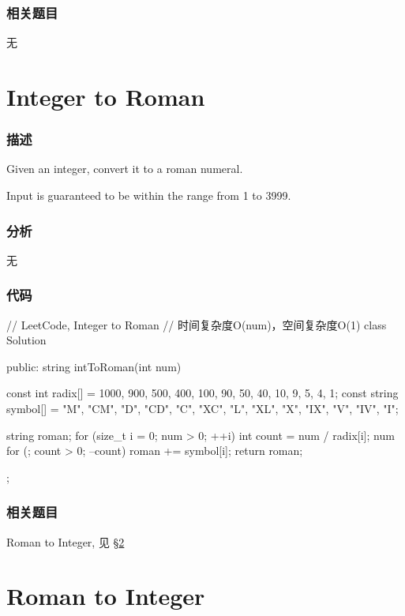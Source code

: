 \subsubsection{相关题目}
\begindot
\item 无
\myenddot


\section{Integer to Roman} %
\label{sec:integer-to-roman}


\subsubsection{描述}
Given an integer, convert it to a roman numeral.

Input is guaranteed to be within the range from 1 to 3999.


\subsubsection{分析}
无


\subsubsection{代码}
\begin{Code}
// LeetCode, Integer to Roman
// 时间复杂度O(num)，空间复杂度O(1)
class Solution {
public:
    string intToRoman(int num) {
        const int radix[] = {1000, 900, 500, 400, 100, 90,
                50, 40, 10, 9, 5, 4, 1};
        const string symbol[] = {"M", "CM", "D", "CD", "C", "XC",
                "L", "XL", "X", "IX", "V", "IV", "I"};

        string roman;
        for (size_t i = 0; num > 0; ++i) {
            int count = num / radix[i];
            num %
            for (; count > 0; --count) roman += symbol[i];
        }
        return roman;
    }
};
\end{Code}


\subsubsection{相关题目}
\begindot
\item Roman to Integer, 见 \S \ref{sec:roman-to-integer}
\myenddot


\section{Roman to Integer} %
\label{sec:roman-to-integer}


